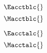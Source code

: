 

\begin{landscape}

\linespread{1}


\sectionsep{}

{
\begin{equation}
  \Eacctblc{}
\end{equation}
}
{
\begin{equation}
  \Macctblc{}
\end{equation}
}

\sectionsep{}

{
\begin{equation}
  \Eacctalc{}
\end{equation}
}
{
\begin{equation}
  \Macctalc{}
\end{equation}
}

\sectionsep{}

\derivsection{}
{
~
    
}
\end{landscape}
